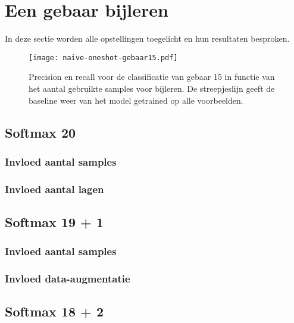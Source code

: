 \section{Een gebaar bijleren}\label{sec:experimenten}
In deze sectie worden alle opstellingen toegelicht en hun resultaten besproken. 


\begin{figure}
	\centering
	\texttt{[image: naive-oneshot-gebaar15.pdf]}
	\caption{Precision en recall voor de classificatie van gebaar 15 in functie van het aantal gebruikte samples voor bijleren. De streepjeslijn geeft de baseline weer van het model getrained op alle voorbeelden.}
	\label{fig:naive-oneshot-gebaar15}
\end{figure}


\subsection{Softmax 20}
\subsubsection{Invloed aantal samples}
\subsubsection{Invloed aantal lagen}

\subsection{Softmax 19 + 1}
\subsubsection{Invloed aantal samples}
\subsubsection{Invloed data-augmentatie}\label{sec:19x1-augm}

\subsection{Softmax 18 + 2}